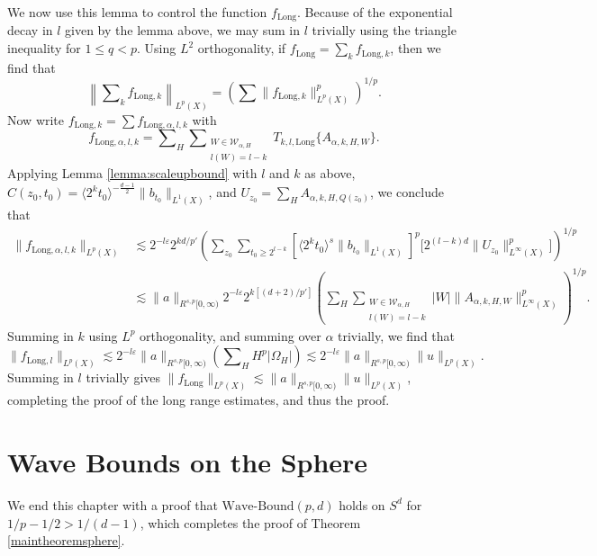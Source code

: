 We now use this lemma to control the function $f_{\text{Long}}$. Because of the exponential decay in $l$ given by the lemma above, we may sum in $l$ trivially using the triangle inequality for $1 \leq q < p$. Using $L^2$ orthogonality, if $f_{\text{Long}} = \sum_k f_{\text{Long},k}$, then we find that
%
\[ \left\| \sum\nolimits_k f_{\text{Long},k} \right\|_{L^p(X)} = \left( \sum \| f_{\text{Long},k} \|_{L^p(X)}^p \right)^{1/p}. \]
%
Now write $f_{\text{Long},k} = \sum f_{\text{Long},\alpha,l,k}$ with
%
\[ f_{\text{Long},\alpha,l,k} = \sum\nolimits_H \sum\nolimits_{\substack{W \in \mathcal{W}_{\alpha,H}\\l(W) = l - k}} T_{k,l,\text{Long}} \{ A_{\alpha,k,H,W} \}. \]
%
Applying Lemma \ref{lemma:scaleupbound} with $l$ and $k$ as above, $C(z_0,t_0) = \langle 2^k t_0 \rangle^{- \frac{d-1}{2}} \| b_{t_0} \|_{L^1(X)}$, and $U_{z_0} = \sum\nolimits_H A_{\alpha,k,H,Q(z_0)}$, we conclude that %
\begin{align*}
    \| f_{\text{Long},\alpha,l,k} \|_{L^p(X)} &\lesssim 2^{-l \varepsilon} 2^{kd/p'} \left( \sum\nolimits_{z_0} \sum\nolimits_{t_0 \geq 2^{l-k}} [ \langle 2^k t_0 \rangle^{s} \| b_{t_0} \|_{L^1(X)} ]^p \big[ 2^{(l-k)d} \| U_{z_0} \|_{L^\infty(X)}^p \big] \right)^{1/p}\\
    &\lesssim \| a \|_{R^{s,p}[0,\infty)} 2^{-l \varepsilon} 2^{k[(d+2)/p']} \left(  \sum\nolimits_H \sum\nolimits_{\substack{W \in \mathcal{W}_{\alpha,H}\\l(W) = l-k}} |W| \| A_{\alpha,k,H,W} \|_{L^\infty(X)}^p \right)^{1/p}.
\end{align*}
%
Summing in $k$ using $L^p$ orthogonality, and summing over $\alpha$ trivially, we find that
%
\[ \| f_{\text{Long},l} \|_{L^p(X)} \lesssim 2^{-l \varepsilon}  \| a \|_{R^{s,p}[0,\infty)} \left( \sum\nolimits_H H^p |\Omega_H| \right) \lesssim 2^{-l \varepsilon}  \| a \|_{R^{s,p}[0,\infty)} \| u \|_{L^p(X)}. \]
%
Summing in $l$ trivially gives $\| f_{\text{Long}} \|_{L^p(X)} \lesssim \| a \|_{R^{s,p}[0,\infty)} \| u \|_{L^p(X)}$, completing the proof of the long range estimates, and thus the proof.

\section{Wave Bounds on the Sphere}

We end this chapter with a proof that $\text{Wave-Bound}(p,d)$ holds on $S^d$ for $1/p - 1/2 > 1/(d-1)$, which completes the proof of Theorem \ref{maintheoremsphere}.

